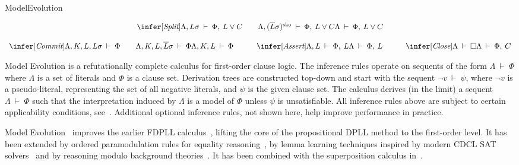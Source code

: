 \begin{entry}{ModelEvolution}




\begin{calculus}


\[
  \begin{array}{ccc}
\multicolumn{3}{c}{
\infer[\textit{Split}]
{\Lambda, L\sigma\: \vdash\: \Phi,\: L \lor C\qquad \Lambda, (\overline{L}\sigma)^{\mathrm{sko}}\: \vdash\:  \Phi,\: L \lor C}
{\Lambda\: \vdash\:  \Phi,\: L \lor C}
}
    \\[3ex]
\infer[\textit{Commit}]
{{\Lambda, K, L, L\sigma}\:\vdash\:{\Phi} \qquad {\Lambda, K, L, \overline{L}\sigma}\:\vdash\:{\Phi}}
{{\Lambda, K, L}\:\vdash\:{\Phi}}
\quad&\quad
\infer[\textit{Assert}]
{{\Lambda, L}\:\vdash\:{\Phi,\: L}}
{{\Lambda}\:\vdash\:{\Phi,\: L}}
\quad&\quad
\infer[\textit{Close}]
{{\Lambda}\:\vdash\:{\Box}}
{{\Lambda}\:\vdash\:{\Phi,\: C}}
  \end{array}
\]
\end{calculus}



\begin{clarifications}
Model Evolution is a refutationally complete calculus for first-order clause
logic. The inference rules operate on sequents of the form $\Lambda\:\vdash\:\Phi$ where $\Lambda$ is a
set of literals and $\Phi$ is a clause set. Derivation trees are constructed top-down
and start with the sequent $\neg v\:\vdash\:\psi$, where $\neg v$ is a pseudo-literal, representing
the set of all negative literals, and $\psi$ is the given clause set. The calculus
derives (in the limit) a sequent $\Lambda\:\vdash\:\Phi$ such that the interpretation induced by $\Lambda$ is a model
of $\Phi$ unless $\psi$ is unsatisfiable. All inference rules above are subject
to certain applicability conditions,
see~\cite{Baumgartner:Tinelli:ModelEvolutionCalculus:CADE:2003}.
Additional optional inference rules, not shown here, help improve performance in practice.
\end{clarifications}

\begin{history}
Model Evolution~\cite{Baumgartner:Tinelli:ModelEvolutionCalculus:CADE:2003}
improves the earlier FDPLL
calculus~\cite{Baumgartner:FDPLL:CADE:00}, lifting the core of the
propositional DPLL method to the first-order level. It has been extended by
ordered paramodulation rules for equality
reasoning~\cite{Baumgartner:Tinelli:ModelEvolutionCalculusEquality:CADE:2005}, by lemma
learning techniques inspired by modern CDCL SAT
solvers~\cite{Baumgartner:etal:ModelEvolutionLearning:LPAR:2006} and by 
reasoning modulo background
theories~\cite{Baumgartner:Fuchs:Tinelli:MELIA:LPAR:2008,Baumgartner:Tinelli:MEET:CADE:2011}. 
It has been combined with the superposition calculus in~\cite{Baumgartner:Waldmann:MESUP:CADE:2009}.
\end{history}


\end{entry}
